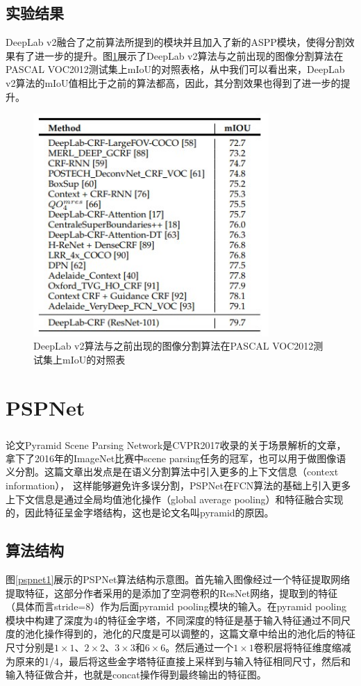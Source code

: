 \documentclass[cn]{elegantbook}
\newcommand{\upcite}[1]{\textsuperscript{\textsuperscript{\cite{#1}}}}
\begin{document}
\subsection{实验结果}
DeepLab v2融合了之前算法所提到的模块并且加入了新的ASPP模块，使得分割效果有了进一步的提升。图\ref{deeplabv2res}展示了DeepLab v2算法与之前出现的图像分割算法在PASCAL VOC2012测试集上mIoU的对照表格，从中我们可以看出来，DeepLab v2算法的mIoU值相比于之前的算法都高，因此，其分割效果也得到了进一步的提升。
\begin{figure}[!h]
	\centering
	\includegraphics[width=0.8\textwidth]{images/deeplabv2.jpg}
	\caption{\label{deeplabv2res}DeepLab v2算法与之前出现的图像分割算法在PASCAL VOC2012测试集上mIoU的对照表}
\end{figure}

\section{PSPNet}
论文Pyramid Scene Parsing Network\upcite{DBLP:journals/corr/ZhaoSQWJ16}是CVPR2017收录的关于场景解析的文章，拿下了2016年的ImageNet比赛中scene parsing任务的冠军，也可以用于做图像语义分割。这篇文章出发点是在语义分割算法中引入更多的上下文信息（context information）， 这样能够避免许多误分割，PSPNet在FCN算法的基础上引入更多上下文信息是通过全局均值池化操作（global average pooling）和特征融合实现的，因此特征呈金字塔结构，这也是论文名叫pyramid的原因。

\subsection{算法结构}
图\ref{pspnet1}展示的PSPNet算法结构示意图。首先输入图像经过一个特征提取网络提取特征，这部分作者采用的是添加了空洞卷积的ResNet网络，提取到的特征（具体而言stride=8）作为后面pyramid pooling模块的输入。在pyramid pooling模块中构建了深度为4的特征金字塔，不同深度的特征是基于输入特征通过不同尺度的池化操作得到的，池化的尺度是可以调整的，这篇文章中给出的池化后的特征尺寸分别是$1\times1$、$2\times2$、$3\times3$和$6\times6$。然后通过一个$1\times1$卷积层将特征维度缩减为原来的1/4，最后将这些金字塔特征直接上采样到与输入特征相同尺寸，然后和输入特征做合并，也就是concat操作得到最终输出的特征图。
\end{document}
